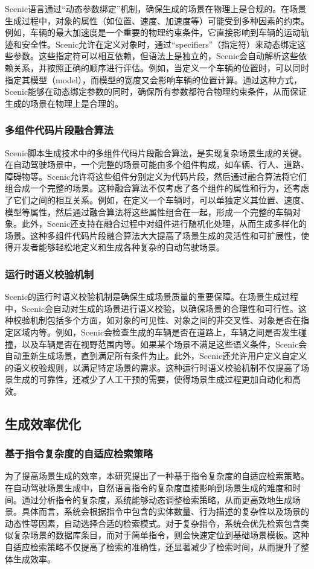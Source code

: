 \documentclass{article}
\begin{document}
Scenic语言通过“动态参数绑定”机制，确保生成的场景在物理上是合规的。在场景生成过程中，对象的属性（如位置、速度、加速度等）可能受到多种因素的约束。例如，车辆的最大加速度是一个重要的物理约束条件，它直接影响到车辆的运动轨迹和安全性。Scenic允许在定义对象时，通过“specifiers”（指定符）来动态绑定这些参数。这些指定符可以相互依赖，但语法上是独立的，Scenic会自动解析这些依赖关系，并按照正确的顺序进行评估。例如，当定义一个车辆的位置时，可以同时指定其模型（model），而模型的宽度又会影响车辆的位置计算。通过这种方式，Scenic能够在动态绑定参数的同时，确保所有参数都符合物理约束条件，从而保证生成的场景在物理上是合理的。
\subsubsection{多组件代码片段融合算法}
Scenic脚本生成技术中的多组件代码片段融合算法，是实现复杂场景生成的关键。在自动驾驶场景中，一个完整的场景可能由多个组件构成，如车辆、行人、道路、障碍物等。Scenic允许将这些组件分别定义为代码片段，然后通过融合算法将它们组合成一个完整的场景。这种融合算法不仅考虑了各个组件的属性和行为，还考虑了它们之间的相互关系。例如，在定义一个车辆时，可以单独定义其位置、速度、模型等属性，然后通过融合算法将这些属性组合在一起，形成一个完整的车辆对象。此外，Scenic还支持在融合过程中对组件进行随机化处理，从而生成多样化的场景。这种多组件代码片段融合算法大大提高了场景生成的灵活性和可扩展性，使得开发者能够轻松地定义和生成各种复杂的自动驾驶场景。
\subsubsection{运行时语义校验机制}
Scenic的运行时语义校验机制是确保生成场景质量的重要保障。在场景生成过程中，Scenic会自动对生成的场景进行语义校验，以确保场景的合理性和可行性。这种校验机制包括多个方面，如对象的可见性、对象之间的非交叉性、对象是否在指定区域内等。例如，Scenic会检查生成的车辆是否在道路上，车辆之间是否发生碰撞，以及车辆是否在视野范围内等。如果某个场景不满足这些语义条件，Scenic会自动重新生成场景，直到满足所有条件为止。此外，Scenic还允许用户定义自定义的语义校验规则，以满足特定场景的需求。这种运行时语义校验机制不仅提高了场景生成的可靠性，还减少了人工干预的需要，使得场景生成过程更加自动化和高效。

\subsection{生成效率优化}
\subsubsection{基于指令复杂度的自适应检索策略}
为了提高场景生成的效率，本研究提出了一种基于指令复杂度的自适应检索策略。在自动驾驶场景生成中，自然语言指令的复杂度直接影响到场景生成的难度和时间。通过分析指令的复杂度，系统能够动态调整检索策略，从而更高效地生成场景。具体而言，系统会根据指令中包含的实体数量、行为描述的复杂性以及场景的动态性等因素，自动选择合适的检索模式。对于复杂指令，系统会优先检索包含类似复杂场景的数据库条目，而对于简单指令，则会快速定位到基础场景模板。这种自适应检索策略不仅提高了检索的准确性，还显著减少了检索时间，从而提升了整体生成效率。
\end{document}
